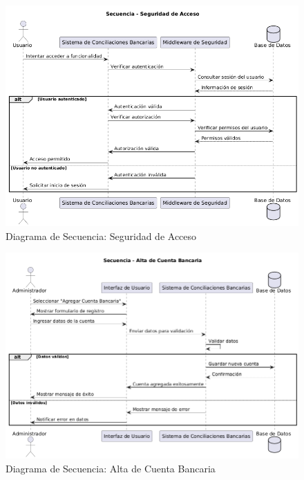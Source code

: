 \documentclass{article}
\begin{document}
\begin{figure}[H]
    \centering
    \includegraphics[width=\textwidth]{secuencia/SeguridadAcceso.png}
    \caption{Diagrama de Secuencia: Seguridad de Acceso}
\end{figure}

\begin{figure}
    \centering
    \includegraphics[width=\textwidth]{secuencia/AltaDeCuentaBancaria.png}
    \caption{Diagrama de Secuencia: Alta de Cuenta Bancaria}
\end{figure}
\end{document}
